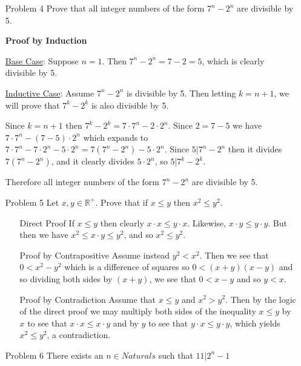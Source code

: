 \documentclass[12pt, oneside]{article}
\newcommand{\Reals}{\mathbb{R}}
\begin{document}
\begin{itemize}
    \item[Problem 4] Prove that all integer numbers of the form \(7^n - 2^n\) are divisible by 5.

          \textbf{Proof by Induction}

          \underline{Base Case}: Suppose \(n = 1\). Then \(7^n - 2^n = 7 - 2 =5\), which is clearly divisible by 5.

          \underline{Inductive Case}: Assume \(7^n - 2^n\) is divisible by 5. Then letting \(k = n+1\), we will prove that \(7^k - 2^k\) is also divisible by 5.

          Since \(k = n +1\) then \(7^k - 2^k = 7\cdot 7^n - 2\cdot 2^n\). Since \(2 = 7 -5\) we have \(7\cdot 7^n - (7-5)\cdot 2^n\) which expands to \(7\cdot 7^n - 7\cdot 2^n - 5 \cdot 2^n = 7(7^n - 2^n) - 5\cdot 2^n\). Since \(5|7^n - 2^n\) then it divides \(7(7^n - 2^n)\), and it clearly divides \(5\cdot 2^n\), so \(5 | 7^k - 2^k\).

          Therefore all integer numbers of the form \(7^n - 2^n\) are divisible by 5.

    \item[Problem 5] Let \(x, y \in \Reals^+\). Prove that if \(x \leq y\) then \(x^2 \leq y^2\).

          \begin{itemize}
              \item[Direct Proof] If \(x \leq y\) then clearly \(x\cdot x \leq y \cdot x\). Likewise, \(x\cdot y \leq y\cdot y\). But then we have \(x^2 \leq x\cdot y \leq y^2\), and so \(x^2 \leq y^2\).

              \item[Proof by Contrapositive] Assume instead \(y^2 < x^2\). Then
                    we see that \(0 < x^2 - y^2\) which is a difference of squares so \(0 < (x + y)(x - y)\) and so dividing both sides by \((x+y)\), we see that \(0 < x -y\) and so \(y < x\).

              \item[Proof by Contradiction] Assume that \(x \leq y\) and \(x^2 > y^2\). Then by the logic of the direct proof we may multiply both sides of the inequality \(x \leq y\) by \(x\) to see that \(x\cdot x \leq x \cdot y\) and by \(y\) to see that \(y\cdot x \leq y \cdot y\), which yields \(x^2 \leq y^2\), a contradiction.

          \end{itemize}

    \item[Problem 6] There exists an \(n \in Naturals\) such that \(11|2^n - 1\)


\end{itemize}
\end{document}
